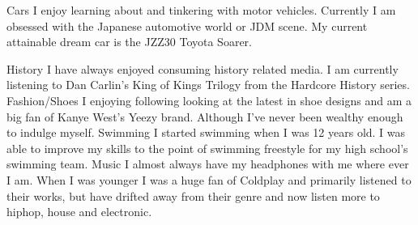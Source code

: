 



\begin{cvskills}
  \cvskill
    {Cars} %
    {I enjoy learning about and tinkering with motor vehicles. Currently I am obsessed with the Japanese automotive world or JDM scene. My current attainable dream car is the JZZ30 Toyota Soarer.} %

  \cvskill
    {History} %
    {I have always enjoyed consuming history related media. I am currently listening to Dan Carlin's King of Kings Trilogy from the Hardcore History series.} %
  \cvskill
    {Fashion/Shoes} %
    {I enjoying following looking at the latest in shoe designs and am a big fan of Kanye West's Yeezy brand. Although I've never been wealthy enough to indulge myself.} %
  \cvskill
    {Swimming} %
    {I started swimming when I was 12 years old. I was able to improve my skills to the point of swimming freestyle for my high school's swimming team.} %
  \cvskill
    {Music} %
    {I almost always have my headphones with me where ever I am. When I was younger I was a huge fan of Coldplay and primarily listened to their works, but have drifted away from their genre and now listen more to hiphop, house and electronic.} %

\end{cvskills}